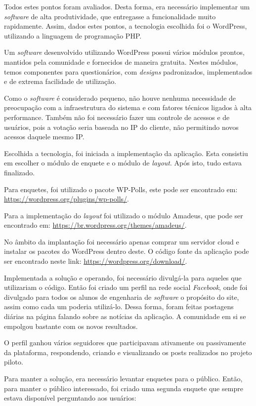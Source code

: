 Todos estes pontos foram avaliados. Desta forma, era necessário implementar um \textit{software}
de alta produtividade, que entregasse a funcionalidade muito rapidamente. Assim, dados estes
pontos, a tecnologia escolhida foi o WordPress, utilizando a linguagem de programação PHP.

Um \textit{software} desenvolvido utilizando WordPress possui vários módulos prontos, mantidos pela comunidade e fornecidos de maneira
gratuita. Nestes módulos, temos componentes para questionários, com \textit{designs} padronizados,
implementados e de extrema facilidade de utilização.

Como o \textit{software} é considerado pequeno, não houve nenhuma necessidade de preocupação com a
infraestrutura  do sistema e com fatores técnicos ligados à alta performance. Também não foi
necessário fazer um controle de acessos e de usuários, pois a votação seria baseada no IP
do cliente, não permitindo novos acessos daquele mesmo IP.

Escolhida a tecnologia, foi iniciada a implementação da aplicação. Esta consistiu em escolher o
módulo de enquete e o módulo de \textit{layout}. Após isto, tudo estava finalizado.

Para enquetes, foi
utilizado o pacote WP-Polls, este pode ser encontrado em: \url{https://wordpress.org/plugins/wp-polls/}.

Para a implementação do \textit{layout} foi utilizado o módulo Amadeus, que pode ser encontrado em:
\url{https://br.wordpress.org/themes/amadeus/}.

No âmbito da implantação foi necessário apenas comprar um servidor cloud e instalar os pacotes do WordPress
dentro deste. O código fonte da aplicação pode ser encontrado neste link:
\url{https://wordpress.org/download/}.

Implementada a solução e operando, foi necessário divulgá-la para aqueles que utilizariam o código.
Então foi criado um perfil na rede social \textit{Facebook}, onde foi divulgado para todos os alunos de engenharia
de \textit{software} o propósito do site, assim como cada um poderia utilizá-lo. Dessa forma, foram feitas postagens diárias
na página falando sobre as notícias da aplicação. A comunidade em si se empolgou bastante com os novos resultados.

O perfil ganhou vários seguidores que participavam ativamente ou passivamente da plataforma, respondendo, criando e
visualizando os posts realizados no projeto piloto.

Para manter a solução, era necessário levantar enquetes para o público. Então, para manter o público interessado,
foi criado uma segunda enquete que sempre estava disponível perguntando aos usuários:

